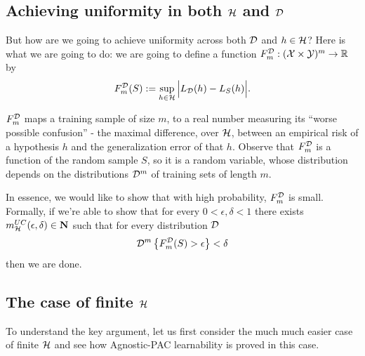 \subsection{Achieving uniformity in both $\mathcal{H}$ and $\mathcal{D}$}

But how are we going to achieve uniformity across both $\mathcal{D}$ and $h\in\mathcal{H}$?
Here is what we are going to do: we are going to define 
a function $F^{\mathcal{D}}_m:(\mathcal{X}\times\mathcal{Y})^m\to\mathbb{R}$ by
\begin{eqnarray} \label{F:eq}
    F^{\mathcal{D}}_m(S) := \sup_{h\in\mathcal{H}} \Big| L_{\mathcal{D}}(h) - L_S(h) \Big|.
\end{eqnarray}

$F^{\mathcal{D}}_m$ maps a training sample of size $m$, to a real number measuring its
``worse possible confusion'' - the maximal difference, over $\mathcal{H}$, between an
empirical risk of a hypothesis $h$ and the generalization error of that $h$. 
Observe that $F^{\mathcal{D}}_m$ is a function of the random sample $S$, so it is 
a random variable,
whose distribution depends on the distributions $\mathcal{D}^m$ of training sets of
length $m$. 
 
In essence, we would like to show that with high probability, $F^{\mathcal{D}}_m$ is small.
Formally, if we're able to show that for every $0<\epsilon,\delta<1$ there
exists $m^{UC}_{\mathcal{H}}(\epsilon,\delta)\in\mathbf{N}$ such that for every distribution $\mathcal{D}$
\[
  \mathcal{D}^m\left\{ F_m^{\mathcal{D}}(S)>\epsilon \right\} < \delta
\]
then we are done.

\subsection{The case of finite $\mathcal{H}$}


To understand the key argument, let us first consider the much much easier case
of finite $\mathcal{H}$ and see how Agnostic-PAC learnability is proved in this case. 

